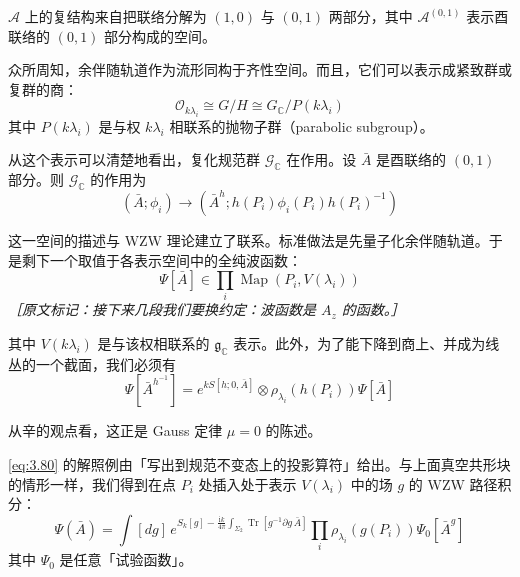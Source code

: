 $\mathcal{A}$ 上的复结构来自把联络分解为 $(1,0)$ 与 $(0,1)$ 两部分，其中 $\mathcal{A}^{(0,1)}$ 表示酉联络的 $(0,1)$ 部分构成的空间。

众所周知，余伴随轨道作为流形同构于齐性空间。而且，它们可以表示成紧致群或复群的商：
\begin{equation}
  \mathcal{O}_{k\lambda_i}\cong G/H\cong G_{\mathbb{C}}/P(k\lambda_i)
  \tag{3.77}
  \label{eq:3.77}
\end{equation}
其中 $P(k\lambda_i)$ 是与权 $k\lambda_i$ 相联系的抛物子群（parabolic subgroup）。

从这个表示可以清楚地看出，复化规范群 $\mathcal{G}_{\mathbb{C}}$ 在作用。设 $\bar A$ 是酉联络的 $(0,1)$ 部分。则 $\mathcal{G}_{\mathbb{C}}$ 的作用为
\begin{equation}
  (\bar A;\phi_i)\to(\bar A^h;h(P_i)\phi_i(P_i)h(P_i)^{-1})
  \tag{3.78}
  \label{eq:3.78}
\end{equation}


这一空间的描述与 WZW 理论建立了联系。标准做法是先量子化余伴随轨道。于是剩下一个取值于各表示空间中的全纯波函数：
\begin{equation}
  \Psi[\bar A]\in\prod_i\operatorname{Map}(P_i,V(\lambda_i))
  \tag{3.79}
  \label{eq:3.79}
\end{equation}
{\small\itshape ［原文标记：接下来几段我们要换约定：波函数是 $A_z$ 的函数。］}

其中 $V(k\lambda_i)$ 是与该权相联系的 $\mathfrak{g}_{\mathbb{C}}$ 表示。此外，为了能下降到商上、并成为线丛的一个截面，我们必须有
\begin{equation}
  \Psi[\bar A^{h^{-1}}]=e^{kS[h;0,\bar A]}\otimes\rho_{\lambda_i}(h(P_i))\Psi[\bar A]
  \tag{3.80}
  \label{eq:3.80}
\end{equation}

从辛的观点看，这正是 Gauss 定律 $\mu=0$ 的陈述。

\eqref{eq:3.80} 的解照例由「写出到规范不变态上的投影算符」给出。与上面真空共形块的情形一样，我们得到在点 $P_i$ 处插入处于表示 $V(\lambda_i)$ 中的场 $g$ 的 WZW 路径积分：
\begin{equation}
  \Psi(\bar A)=\int[dg]\,e^{S_k[g]-\frac{\mathrm{i}k}{4\pi}\int_{\Sigma_2}\operatorname{Tr}[g^{-1}\partial g\,\bar A]}\prod_i\rho_{\lambda_i}(g(P_i))\Psi_0[\bar A^g]
  \tag{3.81}
  \label{eq:3.81}
\end{equation}
其中 $\Psi_0$ 是任意「试验函数」。

